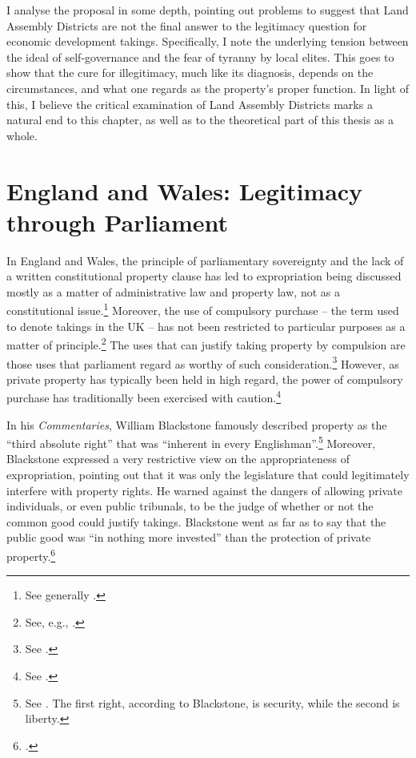 I analyse the proposal in some depth, pointing out problems to suggest that Land Assembly Districts are not the final answer to the legitimacy question for economic development takings. Specifically, I note the underlying tension between the ideal of self-governance and the fear of tyranny by local elites. This goes to show that the cure for illegitimacy, much like its diagnosis, depends on the circumstances, and what one regards as the property's proper function. In light of this, I believe the critical examination of Land Assembly Districts marks a natural end to this chapter, as well as to the theoretical part of this thesis as a whole.

\section{England and Wales: Legitimacy through Parliament}\label{sec:3:2}

In England and Wales, the principle of parliamentary sovereignty and the lack of a written constitutional property clause has led to expropriation being discussed mostly as a matter of administrative law and property law, not as a constitutional issue.\footnote{See generally \cite{taggart98}.} Moreover, the use of compulsory purchase -- the term used to denote takings in the UK -- has not been restricted to particular purposes as a matter of principle.\footnote{See, e.g., \cite[48-49]{waring09}.} The uses that can justify taking property by compulsion are those uses that parliament regard as worthy of such consideration.\footnote{See \cite[48-49]{waring09}.} However, as private property has typically been held in high regard, the power of compulsory purchase has traditionally been exercised with caution.\footnote{See \cite[47-48]{waring09}.}

In his {\it Commentaries}, William Blackstone famously described property as the ``third absolute right'' that was ``inherent in every Englishman''.\footnote{See \cite[134-135]{blackstone79}. The first right, according to Blackstone, is security, while the second is liberty.} Moreover, Blackstone expressed a very restrictive view on the appropriateness of expropriation, pointing out that it was only the legislature that could legitimately interfere with property rights. He warned against the dangers of allowing private individuals, or even public tribunals, to be the judge of whether or not the common good could justify takings. Blackstone went as far as to say that the public good was ``in nothing more invested'' than the protection of private property.\footcite[134-135]{blackstone79}

